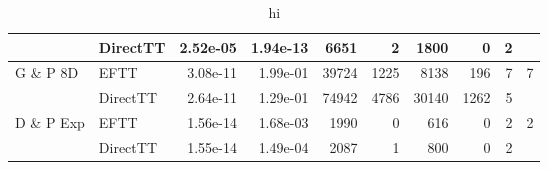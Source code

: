 \begin{table}[!ht]
{\begin{tabular}{llrrrrrrrr}
                                           & DirectTT                        & 2.52e-05                    & 1.94e-13                                           & 6651                           & 2                                                   & 1800                          & 0                                                & 2                                        & {}                                       \\ \hline
            \multirow{2}{*}{G \& P 8D}     & EFTT                            & 3.08e-11                    & 1.99e-01                                           & 39724                          & 1225                                                & 8138                          & 196                                              & 7                                        & {7}                                      \\ %
                                           & DirectTT                        & 2.64e-11                    & 1.29e-01                                           & 74942                          & 4786                                                & 30140                         & 1262                                             & 5                                        & {}                                       \\ \hline
            \multirow{2}{*}{D \& P Exp}    & EFTT                            & 1.56e-14                    & 1.68e-03                                           & 1990                           & 0                                                   & 616                           & 0                                                & 2                                        & {2}                                      \\ %
                                           & DirectTT                        & 1.55e-14                    & 1.49e-04                                           & 2087                           & 1                                                   & 800                           & 0                                                & 2                                        & {}                                       \\ \hline
        \end{tabular}
    }
    \caption{hi}
\end{table}

